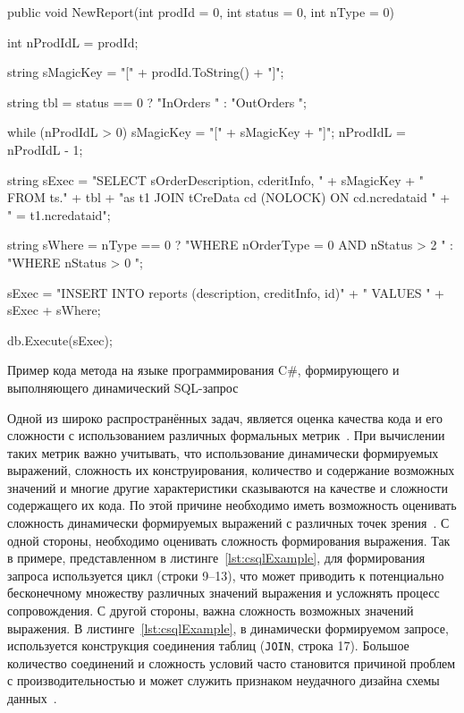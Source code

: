 \begin{listing}
    \begin{pyglist}[language=csharp,numbers=left,numbersep=5pt]

public void NewReport(int prodId = 0, int status = 0, int nType = 0)
{
    int nProdIdL = prodId;

    string sMagicKey = "[" + prodId.ToString() + "]";

    string tbl = status == 0 ? "InOrders " : "OutOrders ";

    while (nProdIdL > 0)
    {
        sMagicKey = "[" + sMagicKey + "]";
        nProdIdL = nProdIdL - 1;
    }

    string sExec =
        "SELECT sOrderDescription, cderitInfo, " + sMagicKey
        + " FROM ts." + tbl +
        "as t1 JOIN tCreData cd (NOLOCK) ON cd.ncredataid "
        + " = t1.ncredataid";

    string sWhere = nType == 0
        ? "WHERE nOrderType = 0 AND nStatus > 2 "
        : "WHERE nStatus > 0 ";

    sExec = "INSERT INTO reports (description, creditInfo, id)"
            + " VALUES " + sExec + sWhere;

    db.Execute(sExec);
}
\end{pyglist}
\caption{Пример кода метода на языке программирования C\#, формирующего и выполняющего динамический SQL-запрос}
\label{lst:csqlExample}
\end{listing}

Одной из широко распространённых задач, является оценка качества кода и его сложности с использованием различных формальных метрик~\cite{SoftwareMetrics}. При вычислении таких метрик важно учитывать, что использование динамически формируемых выражений, сложность их конструирования, количество и содержание возможных значений и многие другие характеристики сказываются на качестве и сложности содержащего их кода. По этой причине необходимо иметь возможность оценивать сложность динамически формируемых выражений с различных точек зрения~\cite{DSQLQualityMesure,DSQLQualityMesureBIG}. С одной стороны, необходимо оценивать сложность формирования выражения. Так в примере, представленном в листинге~\ref{lst:csqlExample}, для формирования запроса используется цикл (строки 9--13), что может приводить к потенциально бесконечному множеству различных значений выражения и усложнять процесс сопровождения. С другой стороны, важна сложность возможных значений выражения. В листинге~\ref{lst:csqlExample}, в динамически формируемом запросе, используется конструкция соединения таблиц (\verb|JOIN|, строка 17). Большое количество соединений и сложность условий часто становится причиной проблем с производительностью и может служить признаком неудачного дизайна схемы данных~\cite{DSQLQualityMesureBIG}.

